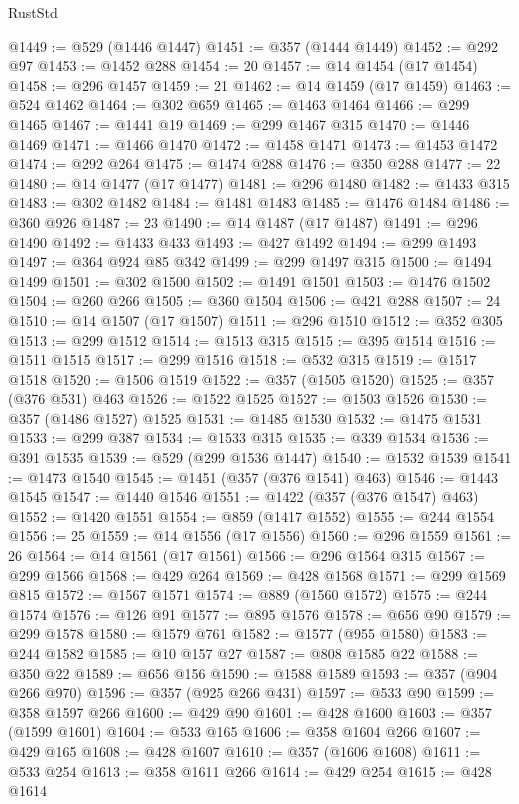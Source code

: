 \begin{lexlean}{RustStd}
\begin{coremodule}
@1449 := @529 (@1446 @1447)
@1451 := @357 (@1444 @1449)
@1452 := @292 @97
@1453 := @1452 @288
@1454 := 20
@1457 := @14 @1454 (@17 @1454)
@1458 := @296 @1457
@1459 := 21
@1462 := @14 @1459 (@17 @1459)
@1463 := @524 @1462
@1464 := @302 @659
@1465 := @1463 @1464
@1466 := @299 @1465
@1467 := @1441 @19
@1469 := @299 @1467 @315
@1470 := @1446 @1469
@1471 := @1466 @1470
@1472 := @1458 @1471
@1473 := @1453 @1472
@1474 := @292 @264
@1475 := @1474 @288
@1476 := @350 @288
@1477 := 22
@1480 := @14 @1477 (@17 @1477)
@1481 := @296 @1480
@1482 := @1433 @315
@1483 := @302 @1482
@1484 := @1481 @1483
@1485 := @1476 @1484
@1486 := @360 @926
@1487 := 23
@1490 := @14 @1487 (@17 @1487)
@1491 := @296 @1490
@1492 := @1433 @433
@1493 := @427 @1492
@1494 := @299 @1493
@1497 := @364 @924 @85 @342
@1499 := @299 @1497 @315
@1500 := @1494 @1499
@1501 := @302 @1500
@1502 := @1491 @1501
@1503 := @1476 @1502
@1504 := @260 @266
@1505 := @360 @1504
@1506 := @421 @288
@1507 := 24
@1510 := @14 @1507 (@17 @1507)
@1511 := @296 @1510
@1512 := @352 @305
@1513 := @299 @1512
@1514 := @1513 @315
@1515 := @395 @1514
@1516 := @1511 @1515
@1517 := @299 @1516
@1518 := @532 @315
@1519 := @1517 @1518
@1520 := @1506 @1519
@1522 := @357 (@1505 @1520)
@1525 := @357 (@376 @531) @463
@1526 := @1522 @1525
@1527 := @1503 @1526
@1530 := @357 (@1486 @1527) @1525
@1531 := @1485 @1530
@1532 := @1475 @1531
@1533 := @299 @387
@1534 := @1533 @315
@1535 := @339 @1534
@1536 := @391 @1535
@1539 := @529 (@299 @1536 @1447)
@1540 := @1532 @1539
@1541 := @1473 @1540
@1545 := @1451 (@357 (@376 @1541) @463)
@1546 := @1443 @1545
@1547 := @1440 @1546
@1551 := @1422 (@357 (@376 @1547) @463)
@1552 := @1420 @1551
@1554 := @859 (@1417 @1552)
@1555 := @244 @1554
@1556 := 25
@1559 := @14 @1556 (@17 @1556)
@1560 := @296 @1559
@1561 := 26
@1564 := @14 @1561 (@17 @1561)
@1566 := @296 @1564 @315
@1567 := @299 @1566
@1568 := @429 @264
@1569 := @428 @1568
@1571 := @299 @1569 @815
@1572 := @1567 @1571
@1574 := @889 (@1560 @1572)
@1575 := @244 @1574
@1576 := @126 @91
@1577 := @895 @1576
@1578 := @656 @90
@1579 := @299 @1578
@1580 := @1579 @761
@1582 := @1577 (@955 @1580)
@1583 := @244 @1582
@1585 := @10 @157 @27
@1587 := @808 @1585 @22
@1588 := @350 @22
@1589 := @656 @156
@1590 := @1588 @1589
@1593 := @357 (@904 @266 @970)
@1596 := @357 (@925 @266 @431)
@1597 := @533 @90
@1599 := @358 @1597 @266
@1600 := @429 @90
@1601 := @428 @1600
@1603 := @357 (@1599 @1601)
@1604 := @533 @165
@1606 := @358 @1604 @266
@1607 := @429 @165
@1608 := @428 @1607
@1610 := @357 (@1606 @1608)
@1611 := @533 @254
@1613 := @358 @1611 @266
@1614 := @429 @254
@1615 := @428 @1614

\end{coremodule}
\end{lexlean}
